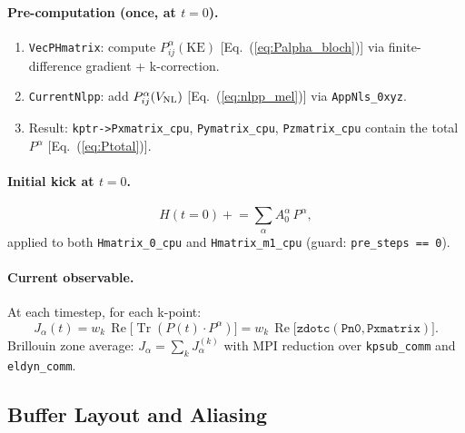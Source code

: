 \documentclass[12pt,letterpaper]{article}
\newcommand{\VNL}{V_{\rm NL}}
\begin{document}
\paragraph{Pre-computation (once, at $t=0$).}
\begin{enumerate}
  \item \texttt{VecPHmatrix}: compute $P^\alpha_{ij}(\text{KE})$
    [Eq.~(\ref{eq:Palpha_bloch})] via finite-difference gradient +
    k-correction.
  \item \texttt{CurrentNlpp}: add $P^\alpha_{ij}(\VNL)$
    [Eq.~(\ref{eq:nlpp_mel})] via \texttt{AppNls\_0xyz}.
  \item Result: \texttt{kptr->Pxmatrix\_cpu}, \texttt{Pymatrix\_cpu},
    \texttt{Pzmatrix\_cpu} contain the total $P^\alpha$ [Eq.~(\ref{eq:Ptotal})].
\end{enumerate}

\paragraph{Initial kick at $t=0$.}
\begin{equation}
  H(t=0) \mathrel{+}= \sum_\alpha A^\alpha_0\,P^\alpha,
\end{equation}
applied to both \texttt{Hmatrix\_0\_cpu} and \texttt{Hmatrix\_m1\_cpu} (guard:
\texttt{pre\_steps == 0}).

\paragraph{Current observable.}
At each timestep, for each k-point:
\begin{equation}
  J_\alpha(t) = w_k\,\operatorname{Re}\bigl[\operatorname{Tr}(P(t)\cdot P^\alpha)\bigr]
  = w_k\,\operatorname{Re}\bigl[\texttt{zdotc}(\texttt{Pn0},\texttt{Pxmatrix})\bigr].
  \label{eq:current_impl}
\end{equation}
Brillouin zone average: $J_\alpha = \sum_k J_\alpha^{(k)}$ with MPI reduction
over \texttt{kpsub\_comm} and \texttt{eldyn\_comm}.

\subsection{Buffer Layout and Aliasing}
\label{sec:impl:buffers}
\end{document}
